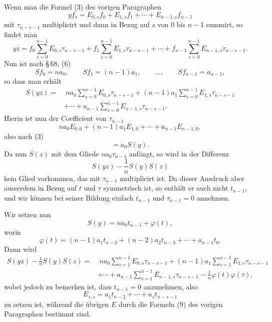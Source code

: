 \documentclass[11pt]{article}
\begin{document}
Wenn man die Formel (3) des vorigen Paragraphen
\begin{equation}
 yf_s=E_{0,s}f_0+E_{1,s}f_1+\cdots+E_{n-1,s}f_{n-1}
\tag{3}
\end{equation}
mit $\tau_{n-s-1}$ multiplicirt und dann in Bezug auf $s$ von $0$ bis $n-1$ summirt, so findet man
\begin{equation}
 yz=f_0\sum_{s=0}^{n-1}E_{0,s}\tau_{n-s-1}
   +f_1\sum_{s=0}^{n-1}E_{1,s}\tau_{n-s-1}
   +\cdots+f_{n-1}\sum_{s=0}^{n-1}E_{n-1,s}\tau_{n-s-1}.
\tag{4}
\end{equation}
Nun ist nach \S\,68, (6)
\[
 Sf_0=na_0,\qquad Sf_1=(n-1)a_1,\qquad \ldots,\qquad Sf_{n-1}=a_{n-1},
\]
so dass man erhält
\[
\begin{aligned}
S(yz)=&\;na_0\sum_{s=0}^{n-1}E_{0,s}\tau_{n-s-1}
+(n-1)a_1\sum_{s=0}^{n-1}E_{1,s}\tau_{n-s-1}\\
&+\cdots+a_{n-1}\sum_{s=0}^{n-1}E_{n-1,s}\tau_{n-s-1}.
\end{aligned}
\]
Hierin ist nun der Coefficient von $\tau_{n-1}$
\[
 na_0E_{0,0}+(n-1)a_1E_{1,0}+\cdots+a_{n-1}E_{n-1,0},
\]
also nach (3)
\[
 =a_0S(y).
\]
Da nun $S(z)$ mit dem Gliede $na_0\tau_{n-1}$ anfängt, so wird in der Differenz
\begin{equation}
 S(yz)-\frac1nS(y)S(z)
\tag{5}
\end{equation}
kein Glied vorkommen, das mit $\tau_{n-1}$ multiplicirt ist. Da dieser Ausdruck aber ausserdem in Bezug auf $t$ und $\tau$ symmetrisch ist, so enthält er auch nicht $t_{n-1}$, und wir können bei seiner Bildung einfach $t_{n-1}$ und $\tau_{n-1}=0$ annehmen.

Wir setzen nun
\[
 S(y)=na_0t_{n-1}+\varphi(t),
\]
worin
\begin{equation}
 \varphi(t)=(n-1)a_1t_{n-2}+(n-2)a_2t_{n-3}+\cdots+a_{n-1}t_0.
\tag{6}
\end{equation}
Dann wird
\begin{equation}
\begin{aligned}
S(yz)-\frac1nS(y)S(z)=&\;na_0\sum_{s=1}^{n-1}E_{0,s}\tau_{n-s-1}
+(n-1)a_1\sum_{s=1}^{n-1}E_{1,s}\tau_{n-s-1}\\
&+\cdots+a_{n-1}\sum_{s=1}^{n-1}E_{n-1,s}\tau_{n-s-1}
-\frac1n\varphi(t)\varphi(\tau),
\end{aligned}
\tag{7}
\end{equation}
wobei jedoch zu bemerken ist, dass $t_{n-1}=0$ anzunehmen, also
\[
 E_{s,s}=a_1t_{n-2}+\cdots+a_st_{n-s-1}
\]
zu setzen ist, während die übrigen $E$ durch die Formeln (9) des vorigen Paragraphen bestimmt sind.
\end{document}
